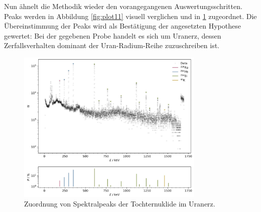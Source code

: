Nun ähnelt die Methodik wieder den vorangegangenen Auswertungsschritten. Peaks werden in Abbildung \ref{fig:plot11} visuell
verglichen und in \ref{fig:plot12} zugeordnet. Die Übereinstimmung der Peaks wird als Bestätigung der angesetzten Hypothese
gewertet: Bei der gegebenen Probe handelt es sich um Uranerz, dessen Zerfallsverhalten dominant der Uran-Radium-Reihe 
zuzuschreiben ist.

\begin{figure}[H]
    \centering
    \includegraphics[width=0.8\textwidth]{content/plots/plot12.jpg}
    \caption{Zuordnung von Spektralpeaks der Tochternuklide im Uranerz.}
    \label{fig:plot12}
\end{figure}
